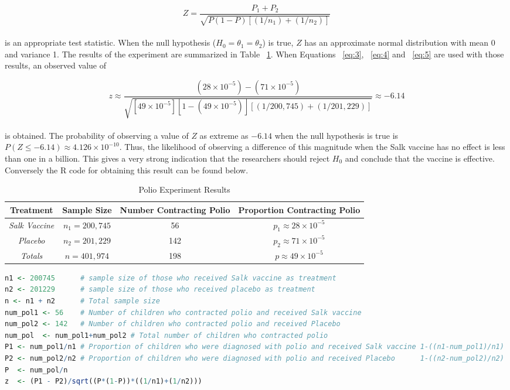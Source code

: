 \documentclass{WileySev}
\begin{document}
\begin{equation}
Z=\frac{P_1+P_2}{\sqrt{P(1-P)[(1/n_1)+(1/n_2)]}}\label{eq:5}
\end{equation}
\\
is an appropriate test statistic. When the null hypothesis ($H_0=\theta_1=\theta_2$) is true, $Z$ has an approximate normal distribution with mean 0 and variance 1.
The results of the experiment are summarized in Table ~\ref{tab:polio}. When Equations ~\ref{eq:3}, ~\ref{eq:4} and ~\ref{eq:5} are used with those results, an observed value of

\begin{equation}
z\approx \frac{(28\times10^{-5})-(71\times10^{-5})}{\sqrt{[49\times10^{-5}][1-(49\times10^{-5})][(1/200,745)+(1/201,229)]}}\approx-6.14
\end{equation}
\\
is obtained. The probability of observing a value of $Z$ as extreme as $-6.14$ when the null hypothesis is true is $P(Z\leq-6.14)\approx4.126\times10^{-10}$. Thus, the likelihood of observing a difference of this magnitude when the Salk vaccine has no effect is less than one in a billion. This gives a very strong indication that the researchers should reject $H_0$ and conclude that the vaccine is effective. Conversely the R code for obtaining this result can be found below.

\begin{table}[h]
\caption{Polio Experiment Results}
\centering
\begin{tabular}{ cccc }
\hline
\textbf{Treatment} & \textbf{Sample Size} & \textbf{Number Contracting Polio} & \textbf{Proportion Contracting Polio} \\
\hline
\textit{Salk Vaccine} & $n_1=200,745$ & 56 & $p_1\approx 28\times 10^{-5}$ \\
\textit{Placebo} & $n_2=201,229$ & 142 & $p_2\approx 71\times 10^{-5}$ \\
\hline
\textit{Totals} & $n=401,974$ & 198 & $p\approx 49\times 10^{-5}$ \\
\hline
\end{tabular}
\label{tab:polio}
\end{table}

\begin{lstlisting}[language=R]
n1 <- 200745      # sample size of those who received Salk vaccine as treatment
n2 <- 201229      # sample size of those who received placebo as treatment
n <- n1 + n2      # Total sample size
num_pol1 <- 56    # Number of children who contracted polio and received Salk vaccine
num_pol2 <- 142   # Number of children who contracted polio and received Placebo
num_pol  <- num_pol1+num_pol2 # Total number of children who contracted polio
P1 <- num_pol1/n1 # Proportion of children who were diagnosed with polio and received Salk vaccine 1-((n1-num_pol1)/n1)
P2 <- num_pol2/n2 # Proportion of children who were diagnosed with polio and received Placebo      1-((n2-num_pol2)/n2)
P  <- num_pol/n   
z  <- (P1 - P2)/sqrt((P*(1-P))*((1/n1)+(1/n2)))
\end{lstlisting}
\end{document}
